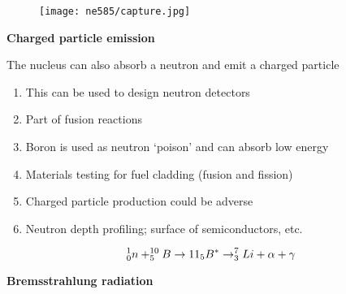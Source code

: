 \documentclass[aspectratio=1610,pdftex,dvipsnames,compress,xcolor={dvipsnames}]{beamer}
\begin{document}
\begin{frame}{}
    \begin{figure}
        \centering
        \texttt{[image: ne585/capture.jpg]}
    \end{figure}
\end{frame}


\begin{frame}[plain]{}
    \centering\LARGE\textbf{Charged particle emission}
\end{frame}


\addtocounter{framenumber}{-1} 
\begin{frame}{The nucleus can also absorb a neutron and emit a charged particle}
    \begin{enumerate}[series=outerlist,topsep=0pt,itemsep=21pt,leftmargin=*,label=(\arabic*)]
        \item[]This can be used to design neutron detectors
        \item[]Part of fusion reactions
        \item[]Boron is used as neutron `poison' and can absorb low energy 
        \item[]Materials testing for fuel cladding (fusion and fission)
        \item[]Charged particle production could be adverse
        \item[]Neutron depth profiling; surface of semiconductors, etc.
    \end{enumerate}

    \vspace*{\fill}

    \begin{equation}
        \LARGE
        ^{1}_{0}n + ^{10}_{5}B \rightarrow {11}_{5}B^{*} \rightarrow ^{7}_{3}Li + \alpha + \gamma
    \end{equation}

\end{frame}


\begin{frame}[plain]{}
    \centering\LARGE\textbf{Bremsstrahlung radiation}
\end{frame}
\end{document}
